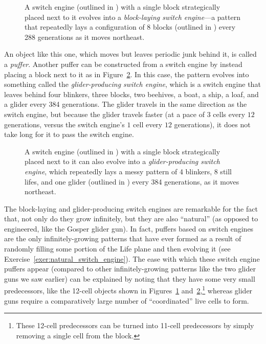 \begin{figure}[!htb]
	\centering{}
	\caption{A switch engine (outlined in ) with a single block strategically placed next to it evolves into a \emph{block-laying switch engine}---a pattern that repeatedly lays a configuration of 8 blocks (outlined in ) every 288 generations as it moves northeast.}\label{fig:switch_engine_block}
\end{figure}

An object like this one, which moves but leaves periodic junk behind it, is called a \emph{puffer}. Another puffer can be constructed from a switch engine by instead placing a block next to it as in Figure~\ref{fig:switch_engine_glider}. In this case, the pattern evolves into something called the \emph{glider-producing switch engine}, which is a switch engine that leaves behind four blinkers, three blocks, two beehives, a boat, a ship, a loaf, and a glider every 384 generations. The glider travels in the same direction as the switch engine, but because the glider travels faster (at a pace of $3$ cells every $12$ generations, versus the switch engine's $1$ cell every $12$ generations), it does not take long for it to pass the switch engine.

\begin{figure}[!htb]
	\centering{}
	\caption{A switch engine (outlined in ) with a single block strategically placed next to it can also evolve into a \emph{glider-producing switch engine}, which repeatedly lays a messy pattern of 4 blinkers, 8 still lifes, and one glider (outlined in ) every 384 generations, as it moves northeast.}\label{fig:switch_engine_glider}
\end{figure}

The block-laying and glider-producing switch engines are remarkable for the fact that, not only do they grow infinitely, but they are also ``natural'' (as opposed to engineered, like the Gosper glider gun). In fact, puffers based on switch engines are the only infinitely-growing patterns that have ever formed as a result of randomly filling some portion of the Life plane and then evolving it (see Exercise~\ref{exer:natural_switch_engine}). The ease with which these switch engine puffers appear (compared to other infinitely-growing patterns like the two glider guns we saw earlier) can be explained by noting that they have some very small predecessors, like the 12-cell objects shown in Figures~\ref{fig:switch_engine_block} and~\ref{fig:switch_engine_glider},\footnote{These 12-cell predecessors can be turned into 11-cell predecessors by simply removing a single cell from the block.} whereas glider guns require a comparatively large number of ``coordinated'' live cells to form.


